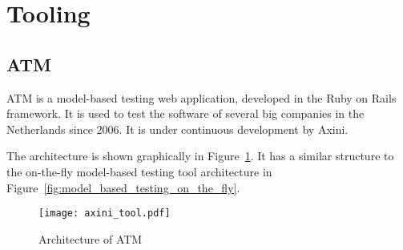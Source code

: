 \section{Tooling}\label{sec:tooling}

\subsection{ATM}\label{sec:descriptionaxini}
ATM is a model-based testing web application, developed in the Ruby on Rails framework. It is used to test the software of several big companies in the Netherlands since 2006. It is under continuous development by Axini.

The architecture is shown graphically in Figure~\ref{fig:axini_tool}. It has a similar structure to the on-the-fly model-based testing tool architecture in Figure~\ref{fig:model_based_testing_on_the_fly}.

\begin{figure}[ht]
  \begin{center}
    \texttt{[image: axini\_tool.pdf]}
  \end{center}
  \caption{Architecture of ATM}
  \label{fig:axini_tool}
\end{figure}

